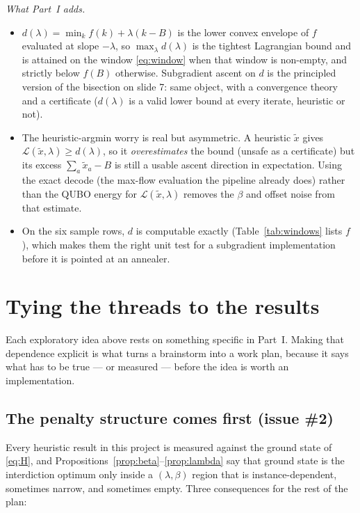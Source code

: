 \documentclass[11pt]{article}
\begin{document}
\emph{What Part~I adds.}
\begin{itemize}[leftmargin=1.5em]
\item $d(\lambda) = \min_k f(k) + \lambda(k - B)$ is the lower convex envelope of $f$ evaluated at slope $-\lambda$, so $\max_\lambda d(\lambda)$ is the tightest Lagrangian bound and is attained on the window \eqref{eq:window} when that window is non-empty, and strictly below $f(B)$ otherwise. Subgradient ascent on $d$ is the principled version of the bisection on slide 7: same object, with a convergence theory and a certificate ($d(\lambda)$ is a valid lower bound at every iterate, heuristic or not).
\item The heuristic-argmin worry is real but asymmetric. A heuristic $\tilde x$ gives $\mathcal L(\tilde x,\lambda) \ge d(\lambda)$, so it \emph{overestimates} the bound (unsafe as a certificate) but its excess $\sum_a \tilde x_a - B$ is still a usable ascent direction in expectation. Using the exact decode (the max-flow evaluation the pipeline already does) rather than the QUBO energy for $\mathcal L(\tilde x,\lambda)$ removes the $\beta$ and offset noise from that estimate.
\item On the six sample rows, $d$ is computable exactly (Table~\ref{tab:windows} lists $f$), which makes them the right unit test for a subgradient implementation before it is pointed at an annealer.
\end{itemize}

\section{Tying the threads to the results}
\label{sec:tie}

Each exploratory idea above rests on something specific in Part~I. Making that dependence explicit is what turns a brainstorm into a work plan, because it says what has to be true --- or measured --- before the idea is worth an implementation.

\subsection*{The penalty structure comes first (issue \#2)}

Every heuristic result in this project is measured against the ground state of \eqref{eq:H}, and Propositions~\ref{prop:beta}--\ref{prop:lambda} say that ground state is the interdiction optimum only inside a $(\lambda,\beta)$ region that is instance-dependent, sometimes narrow, and sometimes empty. Three consequences for the rest of the plan:
\end{document}
